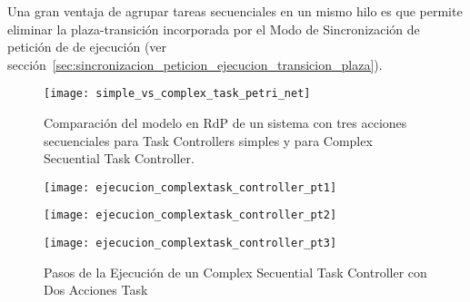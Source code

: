 Una gran ventaja de agrupar tareas
secuenciales en un mismo hilo es que permite eliminar la plaza-transición incorporada por el Modo de
Sincronización de petición de de ejecución (ver
sección~\ref{sec:sincronizacion_peticion_ejecucion_transicion_plaza}).

\begin{figure}[H]
	\centering
	\texttt{[image: simple\_vs\_complex\_task\_petri\_net]}
	\caption{Comparación del modelo en RdP de un sistema con tres
	acciones secuenciales para Task Controllers simples y para Complex Secuential
	Task Controller.}
	\label{fig:simple_task_vs_complex_task_petri_net}
\end{figure}

\begin{figure}[H]
	\centering
	\texttt{[image: ejecucion\_complextask\_controller\_pt1]}
\end{figure}

\begin{figure}[H]
	\centering
	\texttt{[image: ejecucion\_complextask\_controller\_pt2]}
\end{figure}

\begin{figure}[H]
	\centering
	\texttt{[image: ejecucion\_complextask\_controller\_pt3]}
	\caption{Pasos de la Ejecución de un Complex Secuential Task Controller con
	Dos Acciones Task}
	\label{fig:ejecucion_complextask_controller}
\end{figure}